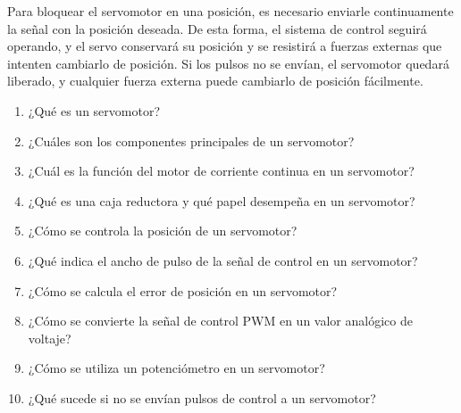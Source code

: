 \documentclass[../main]{subfiles}
\begin{document}
Para bloquear el servomotor en una posición, es necesario enviarle
continuamente la señal con la posición deseada. De esta forma, el
sistema de control seguirá operando, y el servo conservará su
posición y se resistirá a fuerzas externas que intenten cambiarlo de
posición. Si los pulsos no se envían, el servomotor quedará liberado,
y cualquier fuerza externa puede cambiarlo de posición fácilmente.


\begin{enumerate}
  \item ¿Qué es un servomotor?
  \item ¿Cuáles son los componentes principales de un servomotor?
  \item ¿Cuál es la función del motor de corriente continua en un servomotor?
  \item ¿Qué es una caja reductora y qué papel desempeña en un servomotor?
  \item ¿Cómo se controla la posición de un servomotor?
  \item ¿Qué indica el ancho de pulso de la señal de control en un servomotor?
  \item ¿Cómo se calcula el error de posición en un servomotor?
  \item ¿Cómo se convierte la señal de control PWM en un valor
    analógico de voltaje?
  \item ¿Cómo se utiliza un potenciómetro en un servomotor?
  \item ¿Qué sucede si no se envían pulsos de control a un servomotor?
\end{enumerate}
\end{document}
